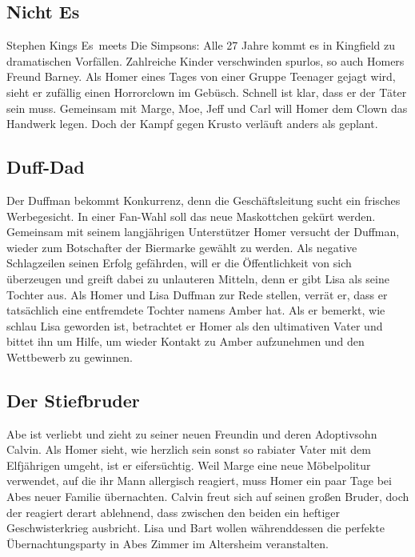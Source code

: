\subsection{Nicht Es}
Stephen Kings \glqq Es\grqq\ meets \glqq Die Simpsons\grqq : Alle 27 Jahre kommt es in Kingfield zu dramatischen Vorfällen. Zahlreiche Kinder verschwinden spurlos, so auch Homers Freund Barney. Als Homer eines Tages von einer Gruppe Teenager gejagt wird, sieht er zufällig einen Horrorclown im Gebüsch. Schnell ist klar, dass er der Täter sein muss. Gemeinsam mit Marge, Moe, Jeff und Carl will Homer dem Clown das Handwerk legen. Doch der Kampf gegen Krusto verläuft anders als geplant.


\subsection{Duff-Dad}
Der Duffman bekommt Konkurrenz, denn die Geschäftsleitung sucht ein frisches Werbegesicht. In einer Fan-Wahl soll das neue Maskottchen gekürt werden. Gemeinsam mit seinem langjährigen Unterstützer Homer versucht der Duffman, wieder zum Botschafter der Biermarke gewählt zu werden. Als negative Schlagzeilen seinen Erfolg gefährden, will er die Öffentlichkeit von sich überzeugen und greift dabei zu unlauteren Mitteln, denn er gibt Lisa als seine Tochter aus. Als Homer und Lisa Duffman zur Rede stellen, verrät er, dass er tatsächlich eine entfremdete Tochter namens Amber hat. Als er bemerkt, wie schlau Lisa geworden ist, betrachtet er Homer als den ultimativen Vater und bittet ihn um Hilfe, um wieder Kontakt zu Amber aufzunehmen und den Wettbewerb zu gewinnen.


\subsection{Der Stiefbruder}
Abe ist verliebt und zieht zu seiner neuen Freundin und deren Adoptivsohn Calvin. Als Homer sieht, wie herzlich sein sonst so rabiater Vater mit dem Elfjährigen umgeht, ist er eifersüchtig. Weil Marge eine neue Möbelpolitur verwendet, auf die ihr Mann allergisch reagiert, muss Homer ein paar Tage bei Abes neuer Familie übernachten. Calvin freut sich auf seinen großen Bruder, doch der reagiert derart ablehnend, dass zwischen den beiden ein heftiger Geschwisterkrieg ausbricht. Lisa und Bart wollen währenddessen die perfekte Übernachtungsparty in Abes Zimmer im Altersheim veranstalten.

